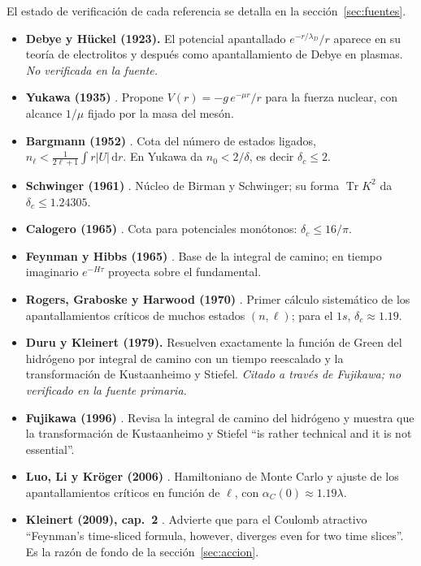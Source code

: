 \documentclass[11pt]{article}
\newcommand{\dd}{\mathrm{d}}
\newcommand{\dc}{\delta_c}
\newcommand{\Tr}{\operatorname{Tr}}
\begin{document}
El estado de verificación de cada referencia se detalla en la sección~\ref{sec:fuentes}.

\begin{itemize}
\item \textbf{Debye y Hückel (1923).} El potencial apantallado $e^{-r/\lambda_D}/r$ aparece en su teoría de electrolitos y después como apantallamiento de Debye en plasmas. \emph{No verificada en la fuente.}
\item \textbf{Yukawa (1935)} \cite{Yukawa1935}. Propone $V(r)=-g\,e^{-\mu r}/r$ para la fuerza nuclear, con alcance $1/\mu$ fijado por la masa del mesón.
\item \textbf{Bargmann (1952)} \cite{Bargmann1952}. Cota del número de estados ligados, $n_\ell<\frac{1}{2\ell+1}\int r|U|\,\dd r$. En Yukawa da $n_0<2/\delta$, es decir $\dc\le2$.
\item \textbf{Schwinger (1961)} \cite{Schwinger1961}. Núcleo de Birman y Schwinger; su forma $\Tr K^2$ da $\dc\le1.24305$.
\item \textbf{Calogero (1965)} \cite{Calogero1965}. Cota para potenciales monótonos: $\dc\le16/\pi$.
\item \textbf{Feynman y Hibbs (1965)} \cite{FeynmanHibbs1965}. Base de la integral de camino; en tiempo imaginario $e^{-H\tau}$ proyecta sobre el fundamental.
\item \textbf{Rogers, Graboske y Harwood (1970)} \cite{Rogers1970}. Primer cálculo sistemático de los apantallamientos críticos de muchos estados $(n,\ell)$; para el $1s$, $\dc\approx1.19$.
\item \textbf{Duru y Kleinert (1979).} Resuelven exactamente la función de Green del hidrógeno por integral de camino con un tiempo reescalado y la transformación de Kustaanheimo y Stiefel. \emph{Citado a través de Fujikawa; no verificado en la fuente primaria.}
\item \textbf{Fujikawa (1996)} \cite{Fujikawa1996}. Revisa la integral de camino del hidrógeno y muestra que la transformación de Kustaanheimo y Stiefel ``is rather technical and it is not essential''.
\item \textbf{Luo, Li y Kröger (2006)} \cite{Luo2006}. Hamiltoniano de Monte Carlo y ajuste de los apantallamientos críticos en función de $\ell$, con $\alpha_C(0)\approx1.19\lambda$.
\item \textbf{Kleinert (2009), cap.~2} \cite{Kleinert2009}. Advierte que para el Coulomb atractivo ``Feynman's time-sliced formula, however, diverges even for two time slices''. Es la razón de fondo de la sección~\ref{sec:accion}.

\end{itemize}
\end{document}
